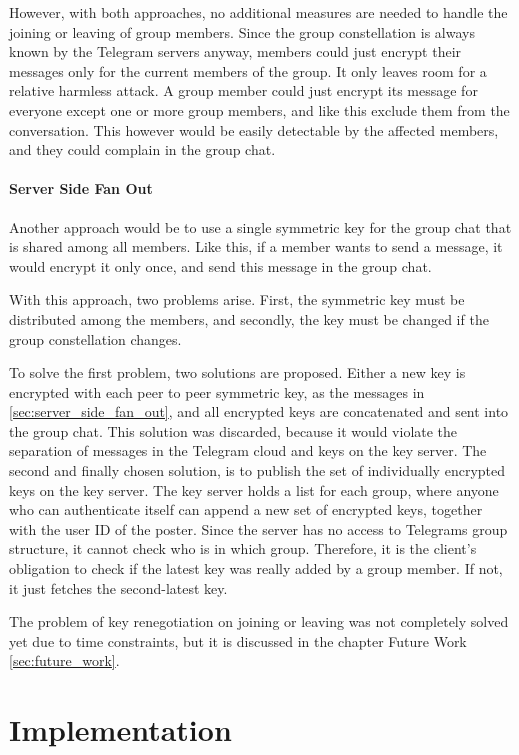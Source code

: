 \documentclass[a4paper, oneside]{discothesis}
\begin{document}
However, with both approaches, no additional measures are needed to handle the joining or leaving of group members. Since the group constellation is always known by the Telegram servers anyway, members could just encrypt their messages only for the current members of the group. It only leaves room for a relative harmless attack. A group member could just encrypt its message for everyone except one or more group members, and like this exclude them from the conversation. This however would be easily detectable by the affected members, and they could complain in the group chat. 

\subsubsection{Server Side Fan Out}

Another approach would be to use a single symmetric key for the group chat that is shared among all members. Like this, if a member wants to send a message, it would encrypt it only once, and send this message in the group chat.

With this approach, two problems arise. First, the symmetric key must be distributed among the members, and secondly, the key must be changed if the group constellation changes.

To solve the first problem, two solutions are proposed. Either a new key is encrypted with each peer to peer symmetric key, as the messages in \ref{sec:server_side_fan_out}, and all encrypted keys are concatenated and sent into the group chat. This solution was discarded, because it would violate the separation of messages in the Telegram cloud and keys on the key server. The second and finally chosen solution, is to publish the set of individually encrypted keys on the key server. The key server holds a list for each group, where anyone who can authenticate itself can append a new set of encrypted keys, together with the user ID of the poster. Since the server has no access to Telegrams group structure, it cannot check who is in which group. Therefore, it is the client's obligation to check if the latest key was really added by a group member. If not, it just fetches the second-latest key.

The problem of key renegotiation on joining or leaving was not completely solved yet due to time constraints, but it is discussed in the chapter Future Work \ref{sec:future_work}.


\chapter{Implementation}
\end{document}
